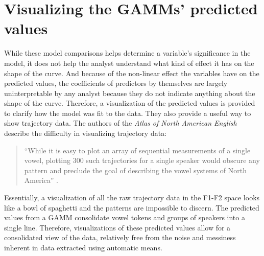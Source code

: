 
\section{Visualizing the GAMMs' predicted values}
\label{sec:visualizing_gamms}

While these model comparisons helps determine a variable’s significance in the model, it does not help the analyst understand what kind of effect it has on the shape of the curve. And because of the non-linear effect the variables have on the predicted values, the coefficients of predictors by themselves are largely uninterpretable by any analyst because they do not indicate anything about the shape of the curve. Therefore, a visualization of the predicted values is provided to clarify how the model was fit to the data. They also provide a useful way to show trajectory data. The authors of the \textit{Atlas of North American English} describe the difficulty in visualizing trajectory data:
\begin{quote}
    ``While it is easy to plot an array of sequential measurements of a single vowel, plotting 300 such trajectories for a single speaker would obscure any pattern and preclude the goal of describing the vowel systems of North America'' \citep[38]{labov_ash_boberg_2006_anae}.
\end{quote}
Essentially, a visualization of all the raw trajectory data in the F1-F2 space looks like a bowl of spaghetti and the patterns are impossible to discern. The predicted values from a GAMM consolidate vowel tokens and groups of speakers into a single line. Therefore, visualizations of these predicted values allow for a consolidated view of the data, relatively free from the noise and messiness inherent in data extracted using automatic means.

